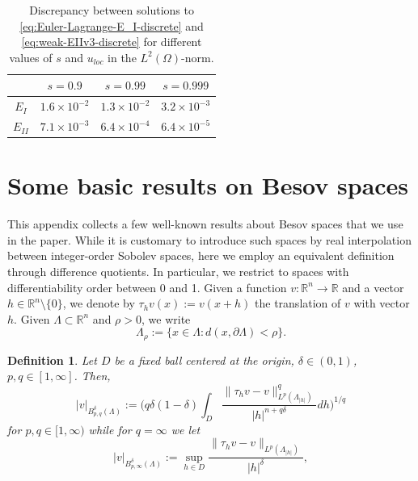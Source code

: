 \documentclass{amsart}
\newcommand{\domain}{\Lambda}
\def\R{{\mathbb R}}
\theoremstyle{plain}
\newtheorem{definition}{Definition}
\numberwithin{equation}{section}
\numberwithin{table}{section}
\numberwithin{figure}{section}
\numberwithin{theorem}{section}
\numberwithin{corollary}{section}
\numberwithin{definition}{section}
\numberwithin{lemma}{section}
\numberwithin{proposition}{section}
\numberwithin{remark}{section}
\begin{document}
\begin{table}[h!]
\begin{center}
\begin{tabular}{c|c|c|c|} 
\cline{2-4}
 & $s = 0.9$  &  $s = 0.99$ & $s = 0.999 $\\ \hline
\multicolumn{1}{|c|}{$E_I$} & $1.6 \times 10^{-2}$ & $1.3 \times 10^{-2}$ & $3.2 \times 10^{-3}$ \\
\hline
\multicolumn{1}{|c|}{$E_{II}$} & $7.1 \times 10^{-3}$ & $6.4 \times 10^{-4}$ & $6.4 \times 10^{-5}$ \\
\hline
\end{tabular}
	\caption{Discrepancy between solutions to \eqref{eq:Euler-Lagrange-E_I-discrete} and \eqref{eq:weak-EIIv3-discrete}  for different values of $s$ and $u_{loc}$  in the $L^2(\Omega)$-norm.} 	\label{tab:energy-comparison}
 \end{center}
\end{table}

\appendix
\section{Some basic results on Besov spaces} \label{sec:Besov}
This appendix collects a few well-known results about Besov spaces that we use in the paper. While it is customary to introduce such spaces by real interpolation between integer-order Sobolev spaces, here we employ an equivalent definition through difference quotients. In particular, we restrict to spaces with differentiability order between 0 and 1. Given a function $v \colon \R^n \to \R$ and a vector $h \in \R^n \setminus \{0\}$, we denote by $\tau_hv(x) := v(x+h)$ the translation of $v$ with vector $h$. Given $\domain \subset \R^n$ and $\rho > 0$, we write
\[
\domain_\rho := \{ x \in \domain \colon d(x, \partial\domain)<\rho \}.
\]

\begin{definition} Let $D$ be a fixed ball centered at the origin, $\delta \in (0,1)$, $p,q \in [1,\infty]$. Then, 
\begin{equation} \label{eq:def-Besov}
|v|_{B^\delta_{p,q}(\domain)} := \Big(q\delta(1-\delta)
\int_{D} \frac{\| \tau_h v - v  \|_{L^p(\domain_{|h|})}^q}{|h|^{n+q\delta}}dh \Big)^{1/q}
\end{equation}
%
 for $p,q\in[1,\infty)$ while for $q=\infty$ we let
%
\[
|v|_{B^\delta_{p,\infty}(\domain)} := \sup_{h \in D} 
\frac{\| \tau_h v -  v \|_{L^p(\domain_{|h|})}}{|h|^{\delta}},
\]
\end{definition}
\end{document}
